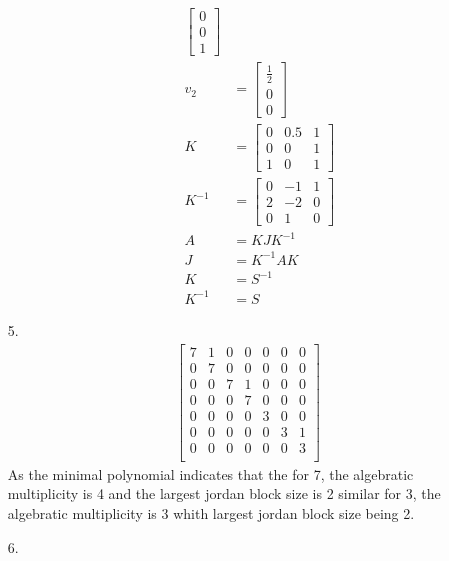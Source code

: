 \documentclass{article}
\begin{document}
\begin{itemize}
\begin{itemize}
\begin{align*}
\begin{bmatrix}
                0\\0\\1
            \end{bmatrix}\\
            v_2&=\begin{bmatrix}
                \frac{1}{2}\\0\\0
            \end{bmatrix}\\
            K&=\begin{bmatrix}
                0&0.5&1\\
                0&0&1\\
                1&0&1
            \end{bmatrix}\\
            K^{-1}&=\begin{bmatrix}
                0&-1&1\\
                2&-2&0\\
                0&1&0
            \end{bmatrix}\\
            A&=KJK^{-1}\\
            J&=K^{-1}AK\\
            K&=S^{-1}\\
            K^{-1}&=S
        \end{align*}
    \end{itemize}
    \item [5.]
    \begin{align*}
        \begin{bmatrix}
            7&1&0&0&0&0&0\\
            0&7&0&0&0&0&0\\
            0&0&7&1&0&0&0\\
            0&0&0&7&0&0&0\\
            0&0&0&0&3&0&0\\
            0&0&0&0&0&3&1\\
            0&0&0&0&0&0&3\\
        \end{bmatrix}
    \end{align*}
    As the minimal polynomial indicates that the for 7, the algebratic multiplicity is 4 and the largest jordan block size is 2 similar for 3, the algebratic multiplicity is 3 whith largest jordan block size being 2.
    \item [6.]
        \begin{align*}

\end{align*}
\end{itemize}
\end{document}

